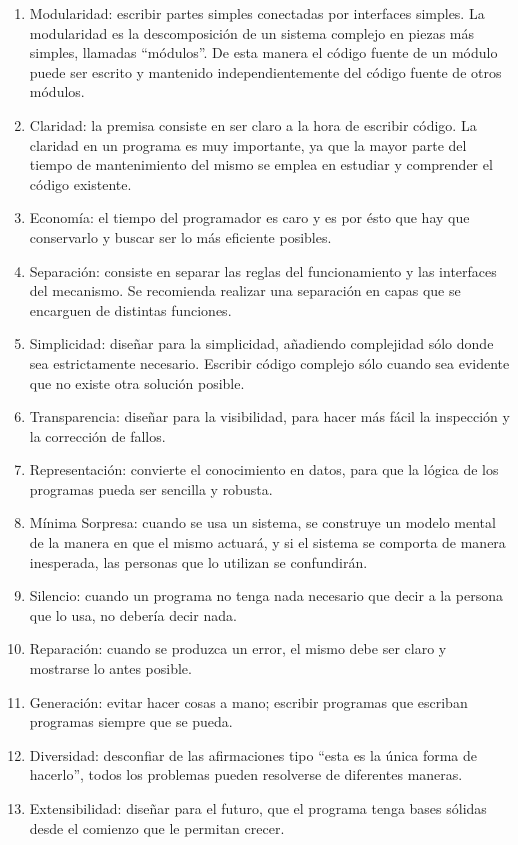 \begin{enumerate}
\item Modularidad: escribir partes simples conectadas por interfaces simples. La modularidad es la descomposición de un sistema complejo en piezas más simples, llamadas ``módulos''. De esta manera el código fuente de un módulo puede ser escrito y mantenido independientemente del código fuente de otros módulos. 

\item Claridad: la premisa consiste en ser claro a la hora de escribir código. La claridad en un programa es muy importante, ya que la mayor parte del tiempo de mantenimiento del mismo se emplea en estudiar y comprender el código existente.

\item Economía: el tiempo del programador es caro y es por ésto que hay que conservarlo y buscar ser lo más eficiente posibles. 

\item Separación: consiste en separar las reglas del funcionamiento y las interfaces del mecanismo. Se recomienda realizar una separación en capas que se encarguen de distintas funciones.

\item Simplicidad: diseñar para la simplicidad, añadiendo complejidad sólo donde sea estrictamente necesario. Escribir código complejo sólo cuando sea evidente que no existe otra solución posible.

\item Transparencia: diseñar para la visibilidad, para hacer más fácil la inspección y la corrección de fallos.

\item Representación: convierte el conocimiento en datos, para que la lógica de los programas pueda ser sencilla y robusta.

\item Mínima Sorpresa: cuando se usa un sistema, se construye un modelo mental de la manera en que el mismo actuará, y si el sistema se comporta de manera inesperada, las personas que lo utilizan se confundirán.

\item Silencio: cuando un programa no tenga nada necesario que decir a la persona que lo usa, no debería decir nada.

\item Reparación: cuando se produzca un error, el mismo debe ser claro y mostrarse lo antes posible.

\item Generación: evitar hacer cosas a mano; escribir programas que escriban programas siempre que se pueda.

\item Diversidad: desconfiar de las afirmaciones tipo ``esta es la única forma de hacerlo'', todos los problemas pueden resolverse de diferentes maneras. 

\item Extensibilidad: diseñar para el futuro, que el programa tenga bases sólidas desde el comienzo que le permitan crecer.
\end{enumerate}

